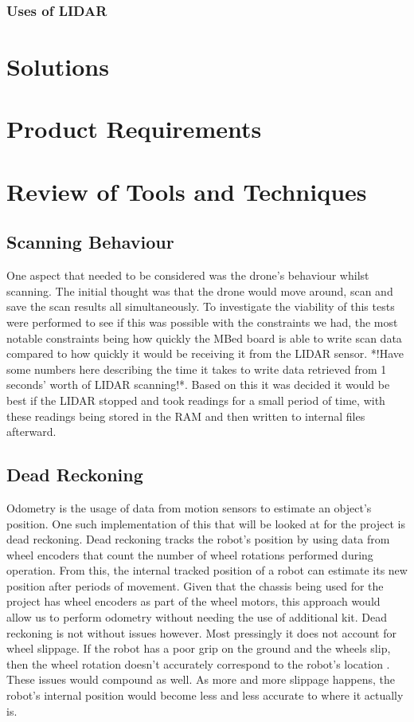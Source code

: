 				
				\subsubsection{Uses of LIDAR}
				
			

		\section{Solutions}
		\section{Product Requirements}
			
		
		
		\section{Review of Tools and Techniques}
			\subsection{Scanning Behaviour}
			One aspect that needed to be considered was the drone's behaviour whilst scanning. The initial thought was that the drone would move around, scan and save the scan results all simultaneously. To investigate the viability of this tests were performed to see if this was possible with the constraints we had, the most notable constraints being how quickly the MBed board is able to write scan data compared to how quickly it would be receiving it from the LIDAR sensor. *!Have some numbers here describing the time it takes to write data retrieved from 1 seconds' worth of LIDAR scanning!*. Based on this it was decided it would be best if the LIDAR stopped and took readings for a small period of time, with these readings being stored in the RAM and then written to internal files afterward. 
			
			\subsection{Dead Reckoning}
			Odometry is the usage of data from motion sensors to estimate an object's position. One such implementation of this that will be looked at for the project is dead reckoning. Dead reckoning tracks the robot's position by using data from wheel encoders that count the number of wheel rotations performed during operation. From this, the internal tracked position of a robot can estimate its new position after periods of movement. Given that the chassis being used for the project has wheel encoders as part of the wheel motors, this approach would allow us to perform odometry without needing the use of additional kit. Dead reckoning is not without issues however. Most pressingly it does not account for wheel slippage. If the robot has a poor grip on the ground and the wheels slip, then the wheel rotation doesn't accurately correspond to the robot's location \citep{choset2001topological}. These issues would compound as well. As more and more slippage happens, the robot's internal position would become less and less accurate to where it actually is.
				
	